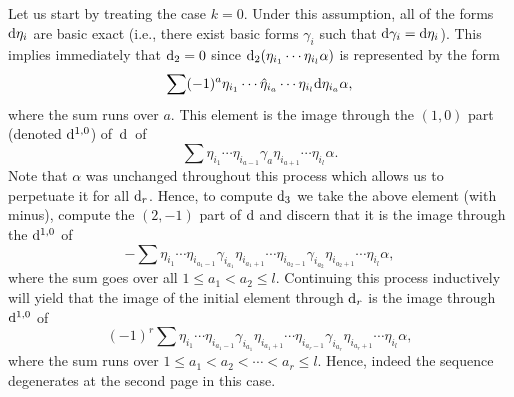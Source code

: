 \documentclass[10pt,a4paper]{amsart}
\numberwithin{equation}{section}
\theoremstyle{definition}
\begin{document}
Let us start by treating the case $k=0$. Under this assumption, all of the forms ${\rm d}\eta_i$ are basic exact (i.e., there exist basic forms $\gamma_i$ such that ${\rm d}\gamma_i={\rm d}\eta_i$). This implies immediately that ${\rm d}_2=0$ since ${\rm d}_2(\eta_{i_1}\cdots \eta_{i_l}\alpha)$ is represented by the form
\[\sum (-1)^a\eta_{i_1}\cdots \hat{\eta}_{i_{a}}\cdots \eta_{i_l}{\rm d}\eta_{i_a}\alpha,\]
where the sum runs over $a$. This element is the image through the $(1,0)$ part \big(denoted ${\rm d}^{1,0}$\big) of~${\rm d}$~of
\[\sum \eta_{i_1}\cdots \eta_{i_{a-1}}\gamma_{a}\eta_{i_{a+1}}\cdots \eta_{i_l}\alpha.\]
Note that $\alpha$ was unchanged throughout this process which allows us to perpetuate it for all ${\rm d}_r$. Hence, to compute ${\rm d}_3$ we take the above element (with minus), compute the $(2,-1)$ part of ${\rm d}$ and discern that it is the image through the ${\rm d}^{1,0}$ of
\[-\sum \eta_{i_1}\cdots \eta_{i_{a_1-1}}\gamma_{i_{a_1}}\eta_{i_{a_1+1}}\cdots \eta_{i_{a_2-1}}\gamma_{i_{a_2}}\eta_{i_{a_2+1}}\cdots \eta_{i_l}\alpha,\]
where the sum goes over all $1\leq a_1<a_2\leq l$. Continuing this process inductively will yield that the image of the initial element through ${\rm d}_r$ is the image through ${\rm d}^{1,0}$ of
\[(-1)^r\sum \eta_{i_1}\cdots \eta_{i_{a_1-1}}\gamma_{i_{a_1}}\eta_{i_{a_1+1}}\cdots \eta_{i_{a_r-1}}\gamma_{i_{a_r}}\eta_{i_{a_r+1}}\cdots \eta_{i_l}\alpha,\]
where the sum runs over $1\leq a_1<a_2<\cdots <a_r\leq l$. Hence, indeed the sequence degenerates at the second page in this case.
\end{document}

